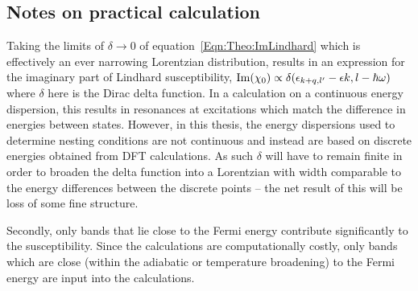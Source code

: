 \subsection{Notes on practical calculation}

Taking the limits of $\delta \to 0$ of equation~\ref{Eqn:Theo:ImLindhard} which is effectively an ever narrowing Lorentzian distribution, results in an expression for the imaginary part of Lindhard susceptibility, $\operatorname{Im}(\chi_0)\propto \delta(\epsilon_{k+q,l^\prime} - \epsilon{k,l} - \hbar\omega)$ where $\delta$ here is the Dirac delta function. In a calculation on a continuous energy dispersion, this results in resonances at excitations which match the difference in energies between states. However, in this thesis, the energy dispersions used to determine nesting conditions are not continuous and instead are based on discrete energies obtained from \ac{DFT} calculations. As such $\delta$ will have to remain finite in order to broaden the delta function into a Lorentzian with width comparable to the energy differences between the discrete points -- the net result of this will be loss of some fine structure.

Secondly, only bands that lie close to the Fermi energy contribute significantly to the susceptibility. Since the calculations are computationally costly, only bands which are close (within the adiabatic or temperature broadening) to the Fermi energy are input into the calculations.
